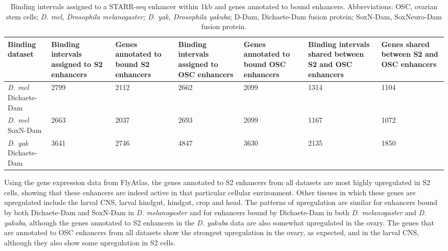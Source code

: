 \begin{table}[h]
\centering
\begin{tabular}{|p{1.5cm}|p{2cm}|p{1.5cm}|p{2cm}|p{2cm}|p{2cm}|p{1.5cm}|}
\hline
\textbf{Binding dataset}     & \textbf{Binding intervals assigned to S2 enhancers} & \textbf{Genes annotated to bound S2 enhancers} & \textbf{Binding intervals assigned to OSC enhancers} & \textbf{Genes annotated to bound OSC enhancers} & \textbf{Binding intervals shared between S2 and OSC enhancers} & \textbf{Genes shared between S2 and OSC enhancers} \\ \hline
\emph{D. mel} Dichaete-Dam & 2799                                       & 2112                                  & 2662                                        & 2099                                   & 1314                                                  & 1104                                      \\ \hline
\emph{D. mel} SoxN-Dam     & 2663                                       & 2037                                  & 2693                                        & 2099                                   & 1167                                                  & 1072                                      \\ \hline
\emph{D. yak} Dichaete-Dam & 3641                                       & 2746                                  & 4847                                        & 3630                                   & 2135                                                  & 1850                                      \\ \hline
\end{tabular}
\caption{Binding intervals assigned to a STARR-seq enhancer within 1kb and genes annotated to bound enhancers. Abbreviations: OSC, ovarian stem cells; \emph{D. mel, Drosophila melanogaster; D. yak, Drosophila yakuba}; D-Dam, Dichaete-Dam fusion protein; SoxN-Dam, SoxNeuro-Dam fusion protein.}
\label{Table 4.11}
\end{table}

Using the gene expression data from FlyAtlas, the genes annotated to S2 enhancers from all datasets are most highly upregulated in S2 cells, showing that these enhancers are indeed active in that particular cellular environment. Other tissues in which these genes are upregulated include the larval CNS, larval hindgut, hindgut, crop and head. The patterns of upregulation are similar for enhancers bound by both Dichaete-Dam and SoxN-Dam in \emph{D. melanogaster} and for enhancers bound by Dichaete-Dam in both \emph{D. melanogaster} and \emph{D. yakuba}, although the genes annotated to S2 enhancers in the \emph{D. yakuba} data are also somewhat upregulated in the ovary. The genes that are annotated to OSC enhancers from all datasets show the strongest upregulation in the ovary, as expected, and in the larval CNS, although they also show some upregulation in S2 cells.\\ 

